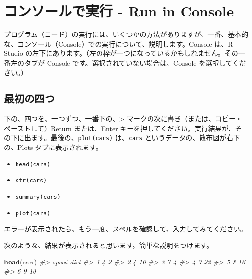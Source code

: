\documentclass[
  xelatex, ja=standard]{bxjsbook}
\newenvironment{Shaded}{\begin{snugshade}}{\end{snugshade}}
\newcommand{\CommentTok}[1]{\textcolor[rgb]{0.56,0.35,0.01}{\textit{#1}}}
\newcommand{\FunctionTok}[1]{\textcolor[rgb]{0.13,0.29,0.53}{\textbf{#1}}}
\newcommand{\NormalTok}[1]{#1}
\providecommand{\tightlist}{%
  \setlength{\itemsep}{0pt}\setlength{\parskip}{0pt}}
\theoremstyle{definition}
\theoremstyle{definition}
\theoremstyle{definition}
\theoremstyle{definition}
\theoremstyle{remark}
\begin{document}
\hypertarget{ux30b3ux30f3ux30bdux30fcux30ebux3067ux5b9fux884c---run-in-console}{%
\section{コンソールで実行 - Run in Console}\label{ux30b3ux30f3ux30bdux30fcux30ebux3067ux5b9fux884c---run-in-console}}

プログラム（コード）の実行には、いくつかの方法がありますが、一番、基本的な、コンソール（Console）での実行について、説明します。Console は、R Studio の左下にあります。（左の枠が一つになっているかもしれません。その一番左のタブが Console です。選択されていない場合は、Console を選択してください。）

\hypertarget{ux6700ux521dux306eux56dbux3064}{%
\subsection{最初の四つ}\label{ux6700ux521dux306eux56dbux3064}}

下の、四つを、一つずつ、一番下の、\textgreater{} マークの次に書き（または、コピー・ペーストして）Return または、Enter キーを押してください。実行結果が、その下に出ます。最後の、\texttt{plot(cars)} は、\texttt{cars} というデータの、散布図が右下の、Plots タブに表示されます。

\begin{itemize}
\tightlist
\item
  \texttt{head(cars)}
\item
  \texttt{str(cars)}
\item
  \texttt{summary(cars)}
\item
  \texttt{plot(cars)}
\end{itemize}

エラーが表示されたら、もう一度、スペルを確認して、入力してみてください。

次のような、結果が表示されると思います。簡単な説明をつけます。

\begin{Shaded}
\begin{Highlighting}[]
\FunctionTok{head}\NormalTok{(cars)}
\CommentTok{\#\textgreater{}   speed dist}
\CommentTok{\#\textgreater{} 1     4    2}
\CommentTok{\#\textgreater{} 2     4   10}
\CommentTok{\#\textgreater{} 3     7    4}
\CommentTok{\#\textgreater{} 4     7   22}
\CommentTok{\#\textgreater{} 5     8   16}
\CommentTok{\#\textgreater{} 6     9   10}
\end{Highlighting}
\end{Shaded}
\end{document}
